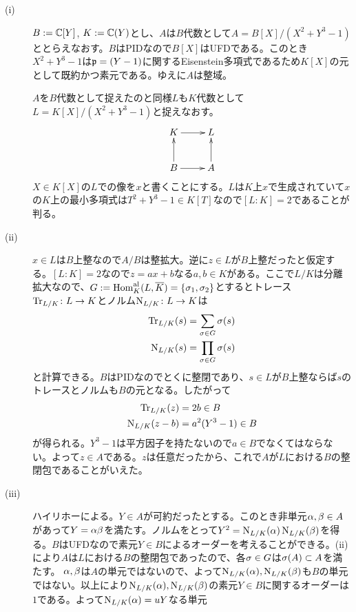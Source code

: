 \begin{sol} ${}$
  \begin{description}
    \item[(i)] $B:= {\mathbb C}[Y]$, $K:= {\mathbb C}(Y)$とし、$A$は$B$代数として$A= B[X]/(X^2 + Y^3-1)$ととらえなおす。$B$はPIDなので$B[X]$はUFDである。このとき$X^2 + Y^3 - 1$は$\mathfrak{p} = (Y-1)$に関するEisenstein多項式であるため$K[X]$の元として既約かつ素元である。ゆえに$A$は整域。

    $A$を$B$代数として捉えたのと同様$L$も$K$代数として$L=K[X]/(X^2 + Y^3 -1)$と捉えなおす。
    \[
    \xymatrix{
    K \ar[r] & L \\
    B \ar[u] \ar[r] & A \ar[u]
    }
    \]
    $X \in K[X]$の$L$での像を$x$と書くことにする。$L$は$K$上$x$で生成されていて$x$の$K$上の最小多項式は$T^2 + Y^3 - 1 \in K[T]$なので$[L:K]=2$であることが判る。
    \item[(ii)] $x \in L$は$B$上整なので$A/B$は整拡大。逆に$z \in L$が$B$上整だったと仮定する。$[L:K] =2$なので$z = ax + b$なる$a,b \in K$がある。ここで$L/K$は分離拡大なので、$G := \operatorname{Hom}_K^{\text{al}}(L,\overline{K}) = \{ {\sigma}_1, {\sigma}_2 \}$とするとトレース
    $\operatorname{Tr}_{L/K} \colon L \to K$とノルム$\operatorname{N}_{L/K} \colon L \to K$は
    \begin{align*}
      \operatorname{Tr}_{L/K}(s) &= \sum_{{\sigma} \in G} {\sigma}(s) \\
      \operatorname{N}_{L/K}(s) &= \prod_{{\sigma} \in G} {\sigma}(s)
    \end{align*}
    と計算できる。$B$はPIDなのでとくに整閉であり、$s \in L$が$B$上整ならば$s$のトレースとノルムも$B$の元となる。したがって
    \begin{align*}
      \operatorname{Tr}_{L/K}(z) &= 2b \in B \\
      \operatorname{N}_{L/K}(z-b) &= a^2(Y^3 - 1) \in B
    \end{align*}
    が得られる。$Y^3 - 1$は平方因子を持たないので$a \in B$でなくてはならない。よって$z \in A$である。$z$は任意だったから、これで$A$が$L$における$B$の整閉包であることがいえた。
\item[(iii)] ハイリホーによる。$Y \in A$が可約だったとする。このとき非単元${\alpha} , \beta \in A$があって$Y = {\alpha} \beta$を満たす。ノルムをとって$Y^2 = \operatorname{N}_{L/K}({\alpha}) \operatorname{N}_{L/K}(\beta)$を得る。$B$はUFDなので素元$Y \in B$によるオーダーを考えることができる。(ii)により$A$は$L$における$B$の整閉包であったので、各${\sigma} \in G$は${\sigma}(A) \subset A$を満たす。
${\alpha}, \beta$は$A$の単元ではないので、よって$\operatorname{N}_{L/K}({\alpha}), \operatorname{N}_{L/K}(\beta)$も$B$の単元ではない。以上により$\operatorname{N}_{L/K}({\alpha}), \operatorname{N}_{L/K}(\beta)$の素元$Y \in B$に関するオーダーは$1$である。よって$\operatorname{N}_{L/K}({\alpha}) = uY$なる単元

\end{description}
\end{sol}

